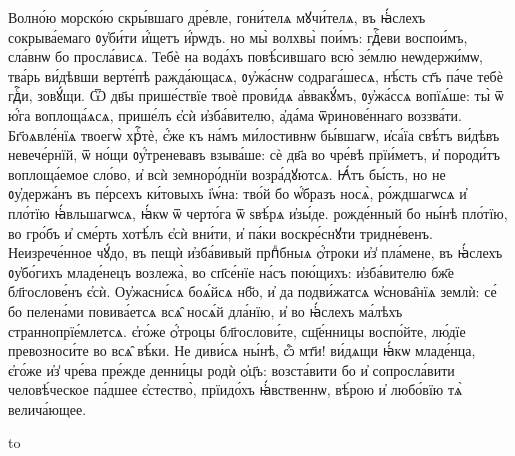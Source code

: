
%
\hKv Волно́ю морско́ю скры́вшаго дре́вле,  гони́телѧ мꙋчи́телѧ, въ ꙗ҆́слехъ сокрыва́емаго ᲂу҆би́ти  и҆́щетъ и҆́рѡдъ. но мы̀ волхвы̀ пои́мъ: гдⷭ҇еви воспои́мъ,  сла́внѡ бо просла́висѧ.
%
 Тебѐ на вода́хъ повѣ́сившаго всю̀ зе́млю  неѡдержи́мѡ, тва́рь ви́дѣвши верте́пѣ ражда́ющасѧ,  ᲂу҆жа́снѡ содрага́шесѧ, нѣ́сть ст҃ъ па́че тебѐ гдⷭ҇и,  зовꙋ́щи.
%
 Ѿ дв҃ы прише́ствїе твоѐ прови́дѧ а҆ввакꙋ́мъ,  ᲂу҆жа́ссѧ вопїѧ́ше: ты̀ ѿ ю҆́га воплоща́ѧсѧ, прише́лъ  є҆сѝ и҆зба́вителю, а҆да́ма ѿринове́ннаго воззва́ти.
%
 Бг҃оѧвле́нїѧ твоегѡ̀ хрⷭ҇тѐ, є҆́же къ на́мъ  ми́лостивнѡ бы́вшагѡ, и҆са́їа свѣ́тъ  ви́дѣвъ невече́рнїй, ѿ но́щи ᲂу҆́треневавъ  взыва́ше: сѐ дв҃а во чре́вѣ прїи́метъ, и҆ породи́тъ  воплоща́емое сло́во, и҆ всѝ земноро́днїи возра́дꙋютсѧ.
%
 Ꙗ҆́тъ бы́сть, но не ᲂу҆держа́нъ въ пе́рсехъ  ки́товыхъ і҆ѡ́на: тво́й бо ѡ҆́бразъ носѧ̀, ро́ждшагѡсѧ и҆  пло́тїю ꙗ҆́вльшагѡсѧ, ꙗ҆́кѡ ѿ черто́га ѿ ѕвѣ́рѧ  и҆зы́де. рожде́нный бо ны́нѣ пло́тїю, во гро́бъ и҆ сме́рть  хотѣ́лъ є҆сѝ вни́ти, и҆ па́ки воскре́снꙋти тридне́венъ.
%
 Неизрече́нное чꙋ́до, въ пещѝ и҆зба́вивый  прпⷣбныѧ ѻ҆́троки и҆з̾ пла́мене, въ ꙗ҆́слехъ ᲂу҆бо́гихъ  младе́нецъ возлежа̀, во сп҃се́нїе на́съ пою́щихъ:  и҆зба́вителю бж҃е бл҃гослове́нъ є҆сѝ.
%
 Оу҆жасни́сѧ боѧ́йсѧ нб҃о, и҆ да подви́жатсѧ  ѡ҆снова̑нїѧ землѝ: се́ бо пелена́ми повива́етсѧ всѧ̑ носѧ́й  дла́нїю, и҆ во ꙗ҆́слехъ ма́лѣхъ страннопрїе́млетсѧ.  є҆го́же ѻ҆́троцы   бл҃гослови́те, сщ҃е́нницы воспо́йте, лю́дїе превозноси́те во  всѧ̑ вѣ́ки.
%
 Не диви́сѧ ны́нѣ, ѽ мт҃и! ви́дѧщи ꙗ҆́кѡ  младе́нца, є҆го́же и҆з̾ чре́ва пре́жде денни́цы родѝ  ѻ҆ц҃ъ: возста́вити бо и҆ сопросла́вити человѣ́ческое  па́дшее є҆стество̀, прїидо́хъ ꙗ҆́вственнѡ, вѣ́рою и҆  любо́вїю тѧ̀ велича́ющее.

\vfil
\hbox to \textwidth{\hfil\rule{2cm}{0.5pt}\hfil}
